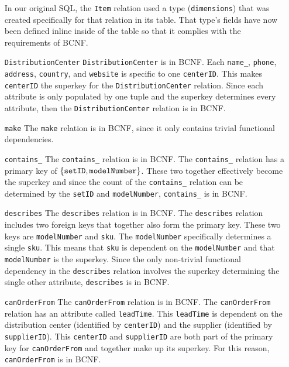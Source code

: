 \documentclass[american,extrafontsizes,12pt,portrait,letterpaper,oneside,onecolumn,final]{memoir}
\newcommand*\rnmath[1]{\(\displaystyle #1 \textstyle\)}
\newcommand*{\sqli}[1]{\texttt{#1}}
\newcommand*{\sqlm}[1]{\text{\sqli{#1}}}
\begin{document}
\begin{enumerate}[leftmargin=*,widest={\texttt{DistributionCenter}}]
In our original SQL, the \sqli{Item} relation used a type (\sqli{dimensions}) that was created specifically for that relation in its table.
That type's fields have now been defined inline inside of the table so that it complies with the requirements of BCNF.

\item[\sqli{DistributionCenter}]
\sqli{DistributionCenter} is in BCNF.
Each \sqli{name_}, \sqli{phone}, \sqli{address}, \sqli{country}, and \sqli{website} is specific to one \sqli{centerID}.
This makes \sqli{centerID} the superkey for the \sqli{DistributionCenter} relation.
Since each attribute is only populated by one tuple and the superkey determines every attribute, then the \sqli{DistributionCenter} relation is in BCNF.

\item[\sqli{make}]
The \sqli{make} relation is in BCNF, since it only contains trivial functional dependencies.

\item[\sqli{contains_}]
The \sqli{contains_} relation is in BCNF.
The \sqli{contains_} relation has a primary key of \rnmath{\{\sqlm{setID}, \sqli{modelNumber}\}}.
These two together effectively become the superkey and since the count of the \sqli{contains_} relation can be determined by the \sqli{setID} and \sqli{modelNumber}, \sqli{contains_} is in BCNF.

\item[\sqli{describes}]
The \sqli{describes} relation is in BCNF.
The \sqli{describes} relation includes two foreign keys that together also form the primary key.
These two keys are \sqli{modelNumber} and \sqli{sku}.
The \sqli{modelNumber} specifically determines a single \sqli{sku}.
This means that \sqli{sku} is dependent on the \sqli{modelNumber} and that \sqli{modelNumber} is the superkey. Since the only non\hyp trivial functional dependency in the \sqli{describes} relation involves the superkey determining the single other attribute, \sqli{describes} is in BCNF.

\item[\sqli{canOrderFrom}]
The \sqli{canOrderFrom} relation is in BCNF.
The \sqli{canOrderFrom} relation has an attribute called \sqli{leadTime}.
This \sqli{leadTime} is dependent on the distribution center (identified by \sqli{centerID}) and the supplier (identified by \sqli{supplierID}).
This \sqli{centerID} and \sqli{supplierID} are both part of the primary key for \sqli{canOrderFrom} and together make up its superkey.
For this reason, \sqli{canOrderFrom} is in BCNF.


\end{enumerate}
\end{document}
